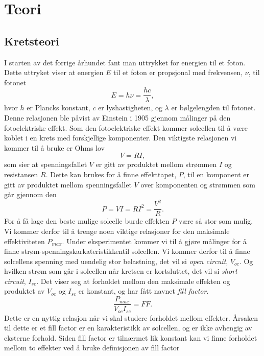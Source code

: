 \documentclass[%
 reprint,
 amsmath,amssymb,
 aps,
 norsk,
 booktabs
]{revtex4-1}
\begin{document}
\section{Teori}
\subsection{Kretsteori}
I starten av det forrige århundet fant man uttrykket for energien til et foton. Dette uttryket viser at energien $E$ til et foton er propsjonal med frekvensen, $\nu$, til fotonet
\begin{equation}
  E = h\nu = \frac{hc}{\lambda} \label{einstein},
\end{equation}hvor $h$ er Plancks konstant, $c$ er lyshastigheten, og $\lambda$ er bølgelengden til fotonet. Denne relasjonen ble påvist av Einstein i 1905 gjennom målinger på den fotoelektriske effekt. Som den fotoelektriske effekt kommer solcellen til å være koblet i en krets med forskjellige komponenter. Den viktigste relasjonen vi kommer til å bruke er Ohms lov
\begin{equation}
  V = RI,
\end{equation}som sier at spenningsfallet $V$ er gitt av produktet mellom strømmen $I$ og resistansen $R$. Dette kan brukes for å finne effekttapet, $P$, til en komponent er gitt av produktet mellom spenningsfallet $V$ over komponenten og strømmen som går gjennom den
\begin{equation}
  P = VI = RI^2 = \frac{V^2}{R} \label{effekt1}.
\end{equation}For å få lage den beste mulige solcelle burde effekten $P$ være så stor som mulig. Vi kommer derfor til å trenge noen viktige relasjoner for den maksimale effektiviteten $P_{max}$. Under eksperimentet kommer vi til å gjøre målinger for å finne strøm-spenningskarkateristikkentil solcellen. Vi kommer derfor til å finne solcellens spenning med uendelig stor belastning, det vil si \textit{open circuit}, $V_{oc}$. Og hvilken strøm som går i solcellen når kretsen er kortsluttet, det vil si \textit{short circuit}, $I_{sc}$. Det viser seg at forholdet mellom den maksimale effekten og produktet av $V_{oc}$ og $I_{sc}$ er konstant, og har fått navnet \textit{fill factor}.
\begin{equation}
  \frac{P_{max}}{V_{oc}I_{sc}} = FF. \label{ff}
\end{equation}Dette er en nyttig relasjon når vi skal studere forholdet mellom effekter. Årsaken til dette er et fill factor er en karakteristikk av solcellen, og er ikke avhengig av eksterne forhold. Siden fill factor er tilnærmet lik konstant kan vi finne forholdet mellom to effekter ved å bruke definisjonen av fill factor
\end{document}
